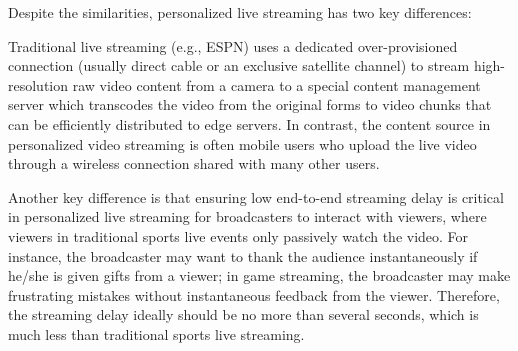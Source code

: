 
Despite the similarities, personalized
live streaming has two key differences:

Traditional live streaming (e.g., ESPN) uses a dedicated
over-provisioned connection (usually direct cable or an exclusive
satellite channel) to stream high-resolution raw video
content from a camera to a special content management
server which transcodes the video from the original forms
to video chunks that can be efficiently distributed to
edge servers.
In contrast, the content source in personalized video
streaming is often mobile users who upload the live video
through a wireless connection shared with many other users.

Another key difference
is that ensuring low end-to-end streaming delay is critical
in personalized live streaming for broadcasters
to interact with viewers, where viewers in traditional sports live
events only passively watch the video.
For instance, the broadcaster may want to thank the audience
instantaneously if he/she is given gifts from a viewer;
in game streaming, the broadcaster may make frustrating
mistakes without instantaneous feedback from the viewer.
Therefore, the streaming delay ideally should be no more than
several seconds, which is much less than traditional sports live
streaming.

